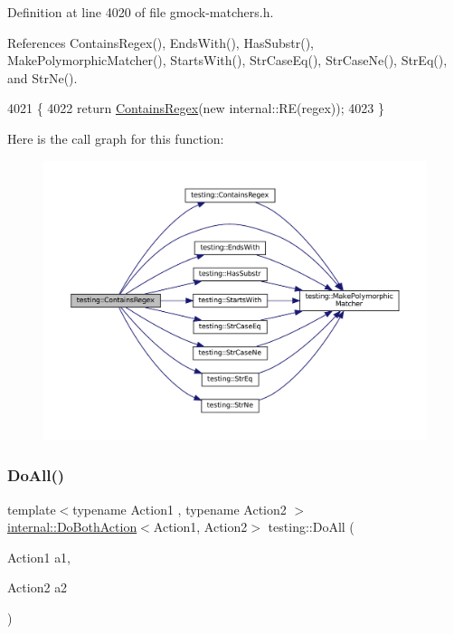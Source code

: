 Definition at line 4020 of file gmock-\/matchers.\+h.



References Contains\+Regex(), Ends\+With(), Has\+Substr(), Make\+Polymorphic\+Matcher(), Starts\+With(), Str\+Case\+Eq(), Str\+Case\+Ne(), Str\+Eq(), and Str\+Ne().


\begin{DoxyCode}
4021                                  \{
4022   \textcolor{keywordflow}{return} \hyperlink{namespacetesting_ad8efafa15630a8274f41f5e22f8f0e49}{ContainsRegex}(\textcolor{keyword}{new} internal::RE(regex));
4023 \}
\end{DoxyCode}
Here is the call graph for this function\+:
\nopagebreak
\begin{figure}[H]
\begin{center}
\leavevmode
\includegraphics[width=350pt]{namespacetesting_ad8efafa15630a8274f41f5e22f8f0e49_cgraph}
\end{center}
\end{figure}
\mbox{\label{namespacetesting_a5f533932753d2af95000e96c4a3042e3}} 
\subsubsection{\texorpdfstring{Do\+All()}{DoAll()}\hspace{0.1cm}{\footnotesize\ttfamily [1/9]}}
{\footnotesize\ttfamily template$<$typename Action1 , typename Action2 $>$ \\
\hyperlink{classtesting_1_1internal_1_1DoBothAction}{internal\+::\+Do\+Both\+Action}$<$Action1, Action2$>$ testing\+::\+Do\+All (\begin{DoxyParamCaption}\item[{Action1}]{a1,  }\item[{Action2}]{a2 }\end{DoxyParamCaption})\hspace{0.3cm}{\ttfamily [inline]}}



